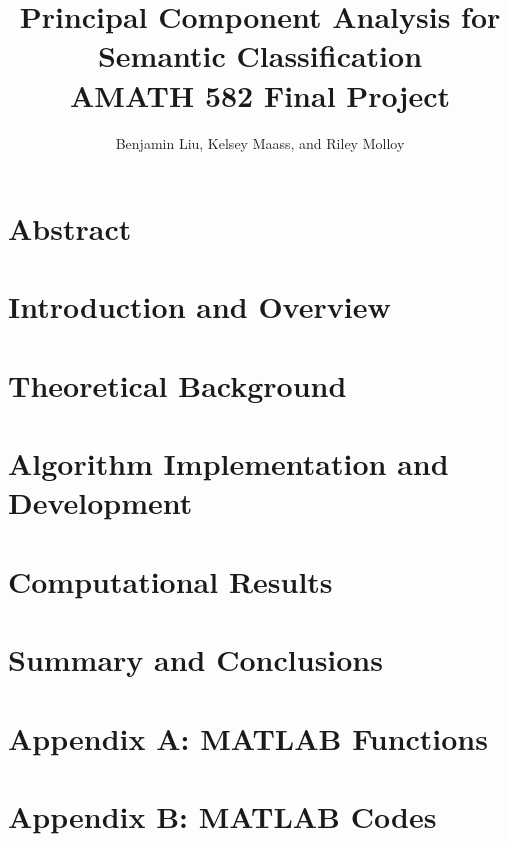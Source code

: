 \documentclass{article}
\title{Principal Component Analysis for Semantic Classification \\ AMATH 582 Final Project}
\author{Benjamin Liu, Kelsey Maass, and Riley Molloy}
\begin{document}
\maketitle
\bigskip

\section*{Abstract}

\section{Introduction and Overview}

\section{Theoretical Background}

\section{Algorithm Implementation and Development}

\section{Computational Results}

\section{Summary and Conclusions}

\section*{Appendix A: MATLAB Functions}

\section*{Appendix B: MATLAB Codes}

\end{document}
